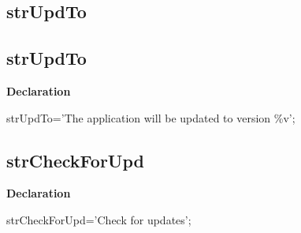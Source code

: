 \documentclass{report}
\newif\ifpdf
\begin{document}
\subsection*{\large{\textbf{strUpdTo}}\normalsize\hspace{1ex}\hrulefill}
\else
\subsection*{strUpdTo}
\fi
\label{trstrings-strUpdTo}
\begin{list}{}{
\setlength{\itemindent}{0cm}
\setlength{\listparindent}{0cm}
\setlength{\leftmargin}{\evensidemargin}
\addtolength{\leftmargin}{\tmplength}
\settowidth{\labelsep}{X}
\addtolength{\leftmargin}{\labelsep}
\setlength{\labelwidth}{\tmplength}
}
\item[\textbf{Declaration}\hfill]
\ifpdf
\begin{flushleft}
\fi
\begin{ttfamily}
strUpdTo='The application will be updated to version {\%}v';\end{ttfamily}

\ifpdf
\end{flushleft}
\fi

\end{list}
\ifpdf
\subsection*{\large{\textbf{strCheckForUpd}}\normalsize\hspace{1ex}\hrulefill}
\else
\subsection*{strCheckForUpd}
\fi
\label{trstrings-strCheckForUpd}
\begin{list}{}{
\setlength{\itemindent}{0cm}
\setlength{\listparindent}{0cm}
\setlength{\leftmargin}{\evensidemargin}
\addtolength{\leftmargin}{\tmplength}
\settowidth{\labelsep}{X}
\addtolength{\leftmargin}{\labelsep}
\setlength{\labelwidth}{\tmplength}
}
\item[\textbf{Declaration}\hfill]
\ifpdf
\begin{flushleft}
\fi
\begin{ttfamily}
strCheckForUpd='Check for updates';\end{ttfamily}

\ifpdf
\end{flushleft}
\fi

\end{list}
\ifpdf
\end{document}
